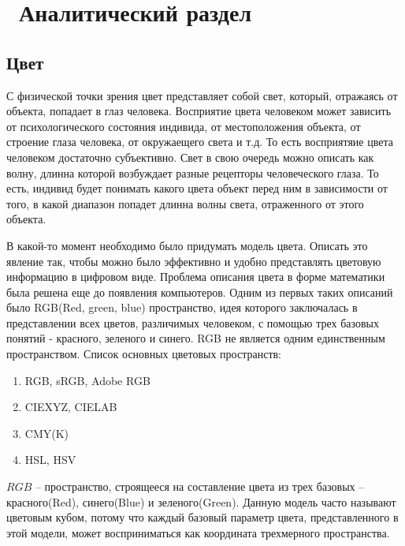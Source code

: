 \chapter{ Аналитический раздел}
\label{cha:analysis}

\section{ Цвет}
С физической точки зрения цвет представляет собой свет, который, отражаясь от объекта, попадает в глаз человека. Восприятие цвета человеком может зависить от психологического состояния индивида, от местоположения объекта, от строение глаза человека, от окружаещего света и т.д. То есть восприятяие цвета человеком достаточно субъективно. Свет в свою очередь можно описать как волну, длинна которой возбуждает разные рецепторы человеческого глаза. То есть, индивид будет понимать какого цвета объект перед ним в зависимости от того, в какой диапазон попадет длинна волны света, отраженного от этого объекта.

В какой-то момент необходимо было придумать модель цвета. Описать это явление так, чтобы можно было эффективно и удобно представлять цветовую информацию в цифровом виде. Проблема описания цвета в форме математики была решена еще до появления компьютеров. Одним из первых таких описаний было RGB(Red, green, blue) пространство, идея которого заключалась в представлении всех цветов, различимых человеком, с помощью трех базовых понятий - красного, зеленого и синего. RGB не является одним единственным пространством. Список основных цветовых пространств:
\begin{enumerate}
	\item RGB, sRGB, Adobe RGB
	\item CIEXYZ, CIELAB
	\item CMY(K)
	\item HSL, HSV
\end{enumerate}

$RGB$ -- пространство, строящееся на составление цвета из трех базовых -- красного(Red), синего(Blue) и зеленого(Green). Данную модель часто называют цветовым кубом, потому что каждый базовый параметр цвета, представленного в этой модели, может восприниматься как координата трехмерного пространства.

\begin{figure}[ht!]
\end{figure}


